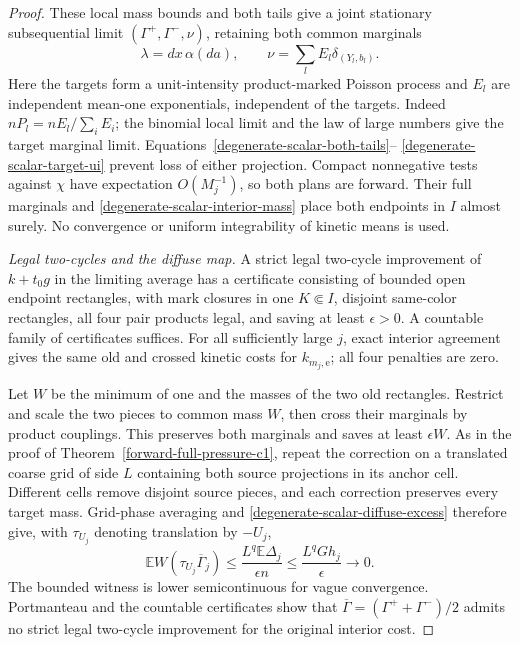 \documentclass[11pt,reqno]{amsart}
\theoremstyle{definition}
\theoremstyle{remark}
\numberwithin{equation}{section}
\newcommand{\E}{\mathbb E}
\begin{document}
\begin{proof}
These local mass bounds and both tails give a joint stationary
subsequential limit \((\Gamma^+,\Gamma^-,\nu)\), retaining both
common marginals
\begin{equation}
\label{degenerate-scalar-rooted-marginals}
 \lambda=dx\,\alpha(da),\qquad
 \nu=\sum_l E_l\delta_{(Y_l,b_l)}.
\end{equation}
Here the targets form a unit-intensity product-marked Poisson process
and \(E_l\) are independent mean-one exponentials, independent of
the targets. Indeed \(nP_l=nE_l/\sum_iE_i\); the binomial local
limit and the law of large numbers give the target marginal limit.
Equations~\eqref{degenerate-scalar-both-tails}--
\eqref{degenerate-scalar-target-ui} prevent loss of either projection.
Compact nonnegative tests against \(\chi\) have expectation
\(O(M_j^{-1})\), so both plans are forward. Their full marginals
and \eqref{degenerate-scalar-interior-mass} place both endpoints in
\(I\) almost surely. No convergence or uniform integrability of
kinetic means is used.

\emph{Legal two-cycles and the diffuse map.}
A strict legal two-cycle improvement of \(k+t_0g\) in the limiting
average has a certificate consisting of bounded open endpoint
rectangles, with mark closures in one \(K\Subset I\), disjoint
same-color rectangles, all four pair products legal, and saving at
least \(\epsilon>0\). A countable family of certificates suffices.
For all sufficiently large \(j\), exact interior agreement gives
the same old and crossed kinetic costs for \(k_{m_j,\mathrm e}\);
all four penalties are zero.

Let \(W\) be the minimum of one and the masses of the two old
rectangles. Restrict and scale the two pieces to common mass \(W\),
then cross their marginals by product couplings. This preserves both
marginals and saves at least \(\epsilon W\). As in the proof of
Theorem~\ref{forward-full-pressure-c1}, repeat the correction on a
translated coarse grid of side \(L\) containing both source
projections in its anchor cell. Different cells remove disjoint
source pieces, and each correction preserves every target mass.
Grid-phase averaging and \eqref{degenerate-scalar-diffuse-excess}
therefore give, with \(\tau_{U_j}\) denoting translation by \(-U_j\),
\begin{equation}
\label{degenerate-scalar-cycle-witness}
 \E W(\tau_{U_j}\overline\Gamma_j)
 \le\frac{L^q\E\Delta_j}{\epsilon n}
 \le\frac{L^qGh_j}{\epsilon}\longrightarrow0.
\end{equation}
The bounded witness is lower semicontinuous for vague convergence.
Portmanteau and the countable certificates show that
\(\overline\Gamma=(\Gamma^++\Gamma^-)/2\) admits no strict legal
two-cycle improvement for the original interior cost.


\end{proof}
\end{document}
